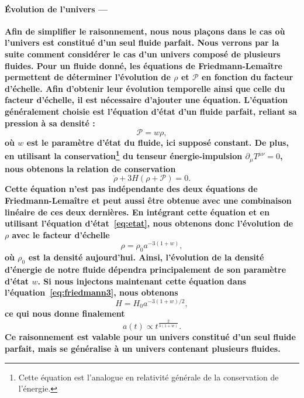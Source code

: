 \documentclass[11pt, twoside, a4paper, openright]{report}
\begin{document}
\paragraph{Évolution de l'univers —}
\textbf{Afin de simplifier le raisonnement, nous nous plaçons dans le cas où l'univers est constitué d'un seul fluide parfait. Nous verrons par la suite comment considérer le cas d'un univers composé de plusieurs fluides.
Pour un fluide donné, les équations de Friedmann-Lemaître permettent de déterminer l'évolution de $\rho$ et $\mathcal{P}$ en fonction du facteur d'échelle. Afin d'obtenir leur évolution temporelle ainsi que celle du facteur d'échelle, il est nécessaire d'ajouter une équation. L'équation généralement choisie est l'équation d'état d'un fluide parfait, reliant sa pression à sa densité :
\begin{equation}
  \label{eq:etat}
  \mathcal{P} = w \rho,
\end{equation}
où $w$ est le paramètre d'état du fluide, ici supposé constant.
De plus, en utilisant la conservation\footnote{Cette équation est l'analogue en relativité générale de la conservation de l'énergie.} du tenseur énergie-impulsion $\partial_{\mu} T^{\mu \nu} = 0$, nous obtenons la relation de conservation
\begin{equation}
  \label{eq:conservation}
  \dot{\rho} + 3 H (\rho + \mathcal{P}) = 0 .
\end{equation}
Cette équation n'est pas indépendante des deux équations de Friedmann-Lemaître et peut aussi être obtenue avec une combinaison linéaire de ces deux dernières. En intégrant cette équation et en utilisant l'équation d'état~\ref{eq:etat}, nous obtenons donc l'évolution de $\rho$ avec le facteur d'échelle
\begin{equation}
  \label{eq:rho_vs_a}
  \rho = \rho_0 a^{-3(1+w)} ,
\end{equation}
où $\rho_0$ est la densité aujourd'hui. Ainsi, l'évolution de la densité d'énergie de notre fluide dépendra principalement de son paramètre d'état $w$. Si nous injectons maintenant cette équation dans l'équation~\ref{eq:friedmann3}, nous obtenons
\begin{equation}
  \label{eq:H_evol}
  H = H_0 a^{-3 (1+w) / 2} ,
\end{equation}
ce qui nous donne finalement
\begin{equation}
  \label{eq:a_vs_t}
  a(t) \propto t^{\frac{2}{3(1+w)}} .
\end{equation}
Ce raisonnement est valable pour un univers constitué d'un seul fluide parfait, mais se généralise à un univers contenant plusieurs fluides. }
\end{document}
